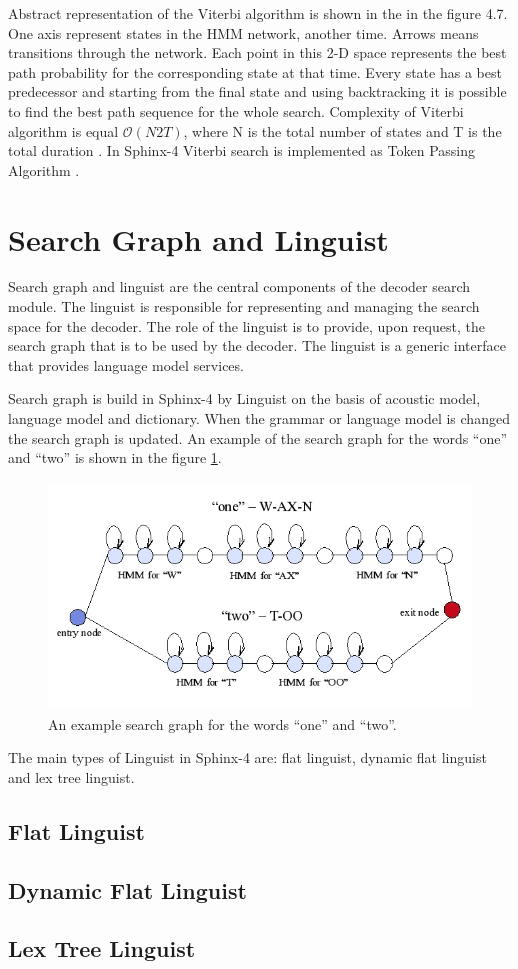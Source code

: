 Abstract representation of the Viterbi algorithm is shown in the in the figure 4.7. One axis represent states in the HMM network, another time.
 Arrows means transitions through the network. Each point in this 2-D space represents the best path probability for the corresponding state at that time. 
 Every state has a best predecessor and starting from the final state and using backtracking it is possible to find the best path sequence for the whole search.
Complexity of Viterbi algorithm is equal $\mathcal{O}(N2T)$, where N
is the total number of states and T is the total duration \parencite
{Ravishankar96efficientalgorithms}. In Sphinx-4 Viterbi search is implemented as
Token Passing Algorithm \parencite {Young89Token}. 

\section {Search Graph and Linguist} 

Search graph and linguist are the central components of the decoder search
module.  The linguist is responsible for representing and managing the search
space for the decoder. The role of the linguist is to provide, upon request, the search graph that is to be used by the decoder.
The linguist is a generic interface that provides language model services.

Search graph is build in Sphinx-4 by Linguist on the basis of acoustic
model, language model and dictionary. When the grammar or language model is changed the
search graph is updated.  An example of the search graph for the words ``one''
and ``two'' is shown in the figure \ref{fig:hmm}.

\begin{figure}[htbp]
  \centering
    \includegraphics[width=1.0\textwidth]{images/hmm.png}
 \caption{An example search graph for the words ``one'' and ``two''.}
  \label{fig:hmm}
\end {figure}

The main types of Linguist in Sphinx-4 are: flat linguist, dynamic flat linguist
and lex tree linguist. 

\subsection {Flat Linguist} 
\subsection {Dynamic Flat Linguist} 
\subsection {Lex Tree Linguist} 









